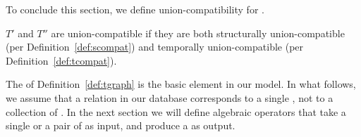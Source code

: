 To conclude this section, we define union-compatibility for \tgs.

\begin{definition} 
\label{def:tuc} 
$T'$ and $T''$ are union-compatible \tgs if they are both structurally
union-compatible (per Definition~\ref{def:scompat}) and temporally
union-compatible (per Definition~\ref{def:tcompat}).
\end{definition}

The \tg of Definition~\ref{def:tgraph} is the basic element in our
model.  In what follows, we assume that a relation in our database
corresponds to a single \tg, not to a collection of \tgs.  In the next
section we will define algebraic operators that take a single \tg or a
pair of \tgs as input, and produce a \tg as output.




